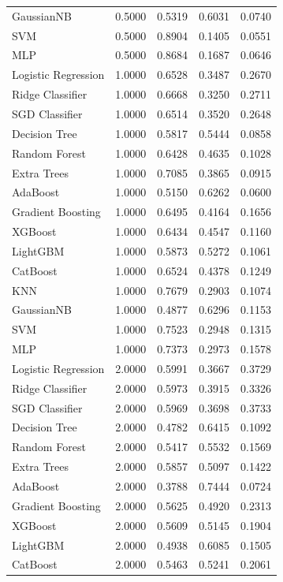 \begin{tabular}{lrrrr}
GaussianNB & 0.5000 & 0.5319 & 0.6031 & 0.0740 \\
SVM & 0.5000 & 0.8904 & 0.1405 & 0.0551 \\
MLP & 0.5000 & 0.8684 & 0.1687 & 0.0646 \\
Logistic Regression & 1.0000 & 0.6528 & 0.3487 & 0.2670 \\
Ridge Classifier & 1.0000 & 0.6668 & 0.3250 & 0.2711 \\
SGD Classifier & 1.0000 & 0.6514 & 0.3520 & 0.2648 \\
Decision Tree & 1.0000 & 0.5817 & 0.5444 & 0.0858 \\
Random Forest & 1.0000 & 0.6428 & 0.4635 & 0.1028 \\
Extra Trees & 1.0000 & 0.7085 & 0.3865 & 0.0915 \\
AdaBoost & 1.0000 & 0.5150 & 0.6262 & 0.0600 \\
Gradient Boosting & 1.0000 & 0.6495 & 0.4164 & 0.1656 \\
XGBoost & 1.0000 & 0.6434 & 0.4547 & 0.1160 \\
LightGBM & 1.0000 & 0.5873 & 0.5272 & 0.1061 \\
CatBoost & 1.0000 & 0.6524 & 0.4378 & 0.1249 \\
KNN & 1.0000 & 0.7679 & 0.2903 & 0.1074 \\
GaussianNB & 1.0000 & 0.4877 & 0.6296 & 0.1153 \\
SVM & 1.0000 & 0.7523 & 0.2948 & 0.1315 \\
MLP & 1.0000 & 0.7373 & 0.2973 & 0.1578 \\
Logistic Regression & 2.0000 & 0.5991 & 0.3667 & 0.3729 \\
Ridge Classifier & 2.0000 & 0.5973 & 0.3915 & 0.3326 \\
SGD Classifier & 2.0000 & 0.5969 & 0.3698 & 0.3733 \\
Decision Tree & 2.0000 & 0.4782 & 0.6415 & 0.1092 \\
Random Forest & 2.0000 & 0.5417 & 0.5532 & 0.1569 \\
Extra Trees & 2.0000 & 0.5857 & 0.5097 & 0.1422 \\
AdaBoost & 2.0000 & 0.3788 & 0.7444 & 0.0724 \\
Gradient Boosting & 2.0000 & 0.5625 & 0.4920 & 0.2313 \\
XGBoost & 2.0000 & 0.5609 & 0.5145 & 0.1904 \\
LightGBM & 2.0000 & 0.4938 & 0.6085 & 0.1505 \\
CatBoost & 2.0000 & 0.5463 & 0.5241 & 0.2061 \\

\end{tabular}

